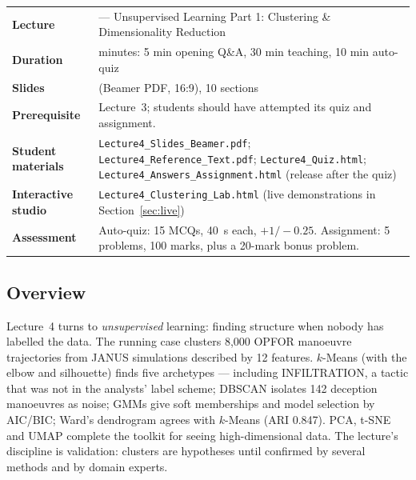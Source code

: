 \documentclass[11pt]{article}
\begin{document}
\begin{center}\small\renewcommand{\arraystretch}{1.25}\begin{tabularx}{\textwidth}{@{}>{\bfseries}p{3.3cm}>{\raggedright\arraybackslash}X@{}}\toprule

\textcolor{NavyN}{Lecture}&4 --- Unsupervised Learning Part 1: Clustering \& Dimensionality Reduction\\
\textcolor{NavyN}{Duration}&45 minutes: 5 min opening Q\&A, 30 min teaching, 10 min auto-quiz\\
\textcolor{NavyN}{Slides}&26 (Beamer PDF, 16:9), 10 sections\\
\textcolor{NavyN}{Prerequisite}&Lecture~3; students should have attempted its quiz and assignment.\\
\textcolor{NavyN}{Student materials}&\texttt{Lecture4\_Slides\_Beamer.pdf}; \texttt{Lecture4\_Reference\_Text.pdf}; \texttt{Lecture4\_Quiz.html}; \texttt{Lecture4\_Answers\_Assignment.html} (release after the quiz)\\
\textcolor{NavyN}{Interactive studio}&\texttt{Lecture4\_Clustering\_Lab.html} (live demonstrations in Section~\ref{sec:live})\\
\textcolor{NavyN}{Assessment}&Auto-quiz: 15 MCQs, 40~s each, $+1/-0.25$. Assignment: 5 problems, 100 marks, plus a 20-mark bonus problem.\\\bottomrule\end{tabularx}\end{center}

\subsection*{Overview}Lecture~4 turns to \emph{unsupervised} learning: finding structure when nobody has labelled the data. The running case clusters 8,000 OPFOR manoeuvre trajectories from JANUS simulations described by 12 features. $k$-Means (with the elbow and silhouette) finds five archetypes --- including INFILTRATION, a tactic that was not in the analysts' label scheme; DBSCAN isolates 142 deception manoeuvres as noise; GMMs give soft memberships and model selection by AIC/BIC; Ward's dendrogram agrees with $k$-Means (ARI 0.847). PCA, t-SNE and UMAP complete the toolkit for seeing high-dimensional data. The lecture's discipline is validation: clusters are hypotheses until confirmed by several methods and by domain experts.
\end{document}
